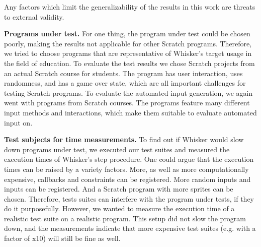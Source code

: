 Any factors which limit the generalizability of the results in this work are threats to external validity.
\parspace

\textbf{Programs under test.} For one thing, the program under test could be chosen poorly,
making the results not applicable for other Scratch programs.
Therefore, we tried to choose programs that are representative of Whisker's target usage in the field of education.
To evaluate the test results we chose Scratch projects from an actual Scratch course for students.
The program has user interaction, uses randomness, and has a game over state,
which are all important challenges for testing Scratch programs.
To evaluate the automated input generation,
we again went with programs from Scratch courses.
The programs feature many different input methods and interactions,
which make them suitable to evaluate automated input on.
\parspace

\textbf{Test subjects for time measurements.}
To find out if Whisker would slow down programs under test,
we executed our test suites and measured the execution times of Whisker's step procedure.
One could argue that the execution times can be raised by a variety factors.
More, as well as more computationally expensive, callbacks and constraints can be registered.
More random inputs and inputs can be registered.
And a Scratch program with more sprites can be chosen.
Therefore, tests suites can interfere with the program under tests, if they do it purposefully.
However, we wanted to measure the execution time of a realistic test suite on a realistic program.
This setup did not slow the program down,
and the measurements indicate that more expensive test suites (e.g. with a factor of x10) will still be fine as well.
%
